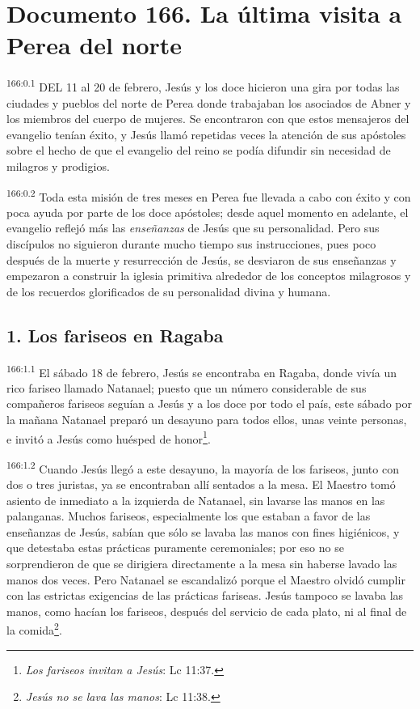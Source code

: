 \chapter{Documento 166. La última visita a Perea del norte}
\par 
\textsuperscript{166:0.1} DEL 11 al 20 de febrero, Jesús y los doce hicieron una gira por todas las ciudades y pueblos del norte de Perea donde trabajaban los asociados de Abner y los miembros del cuerpo de mujeres. Se encontraron con que estos mensajeros del evangelio tenían éxito, y Jesús llamó repetidas veces la atención de sus apóstoles sobre el hecho de que el evangelio del reino se podía difundir sin necesidad de milagros y prodigios.

\par 
\textsuperscript{166:0.2} Toda esta misión de tres meses en Perea fue llevada a cabo con éxito y con poca ayuda por parte de los doce apóstoles; desde aquel momento en adelante, el evangelio reflejó más las \textit{enseñanzas} de Jesús que su personalidad. Pero sus discípulos no siguieron durante mucho tiempo sus instrucciones, pues poco después de la muerte y resurrección de Jesús, se desviaron de sus enseñanzas y empezaron a construir la iglesia primitiva alrededor de los conceptos milagrosos y de los recuerdos glorificados de su personalidad divina y humana.

\section*{1. Los fariseos en Ragaba}
\par 
\textsuperscript{166:1.1} El sábado 18 de febrero, Jesús se encontraba en Ragaba, donde vivía un rico fariseo llamado Natanael; puesto que un número considerable de sus compañeros fariseos seguían a Jesús y a los doce por todo el país, este sábado por la mañana Natanael preparó un desayuno para todos ellos, unas veinte personas, e invitó a Jesús como huésped de honor\footnote{\textit{Los fariseos invitan a Jesús}: Lc 11:37.}.

\par 
\textsuperscript{166:1.2} Cuando Jesús llegó a este desayuno, la mayoría de los fariseos, junto con dos o tres juristas, ya se encontraban allí sentados a la mesa. El Maestro tomó asiento de inmediato a la izquierda de Natanael, sin lavarse las manos en las palanganas. Muchos fariseos, especialmente los que estaban a favor de las enseñanzas de Jesús, sabían que sólo se lavaba las manos con fines higiénicos, y que detestaba estas prácticas puramente ceremoniales; por eso no se sorprendieron de que se dirigiera directamente a la mesa sin haberse lavado las manos dos veces. Pero Natanael se escandalizó porque el Maestro olvidó cumplir con las estrictas exigencias de las prácticas fariseas. Jesús tampoco se lavaba las manos, como hacían los fariseos, después del servicio de cada plato, ni al final de la comida\footnote{\textit{Jesús no se lava las manos}: Lc 11:38.}.


